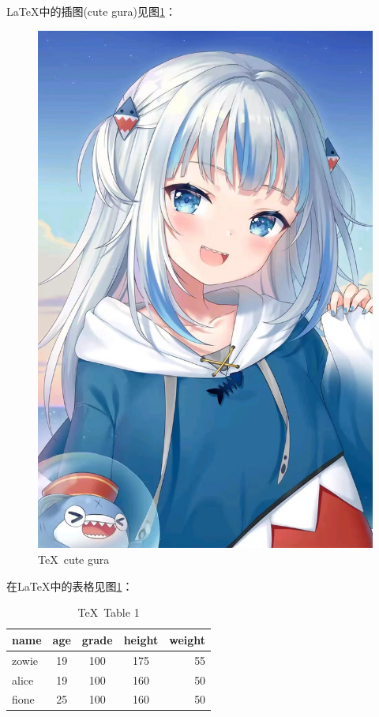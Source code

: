 \documentclass{ctexart}
\begin{document}
    \LaTeX{}中的插图(cute gura)见图\ref{gurafig}：
    \begin{figure}[htbp] %
        \centering 
        \includegraphics[scale=0.1]{gura}
        \caption{\TeX \ cute gura}\label{gurafig}
    \end{figure}


    在\LaTeX{}中的表格见图\ref{table1}：

    \begin{table}[htbp]
        \centering 
        \caption{\TeX \ Table 1}\label{table1}
        \begin{tabular}{| l || c | c | c | r |} %
            \hline %
            name & age & grade & height & weight \\  
            \hline \hline %
            zowie & 19 & 100 & 175 & 55 \\
            \hline
            alice & 19 & 100 & 160 & 50 \\
            \hline
            fione & 25 & 100 & 160 & 50 \\
            \hline
        \end{tabular}
    \end{table}
\end{document}
